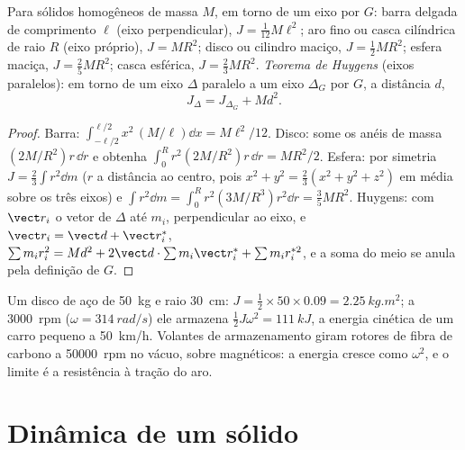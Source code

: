 \begin{proposition}\label{prop:b2:rigid-body-mechanics:inertia}
Para sólidos homogêneos de massa $M$, em torno de um eixo por $G$: barra
delgada de comprimento $\ell$ (eixo perpendicular), $J = \tfrac1{12}M\ell^2$; aro
fino ou casca cilíndrica de raio $R$ (eixo próprio), $J = MR^2$; disco ou
cilindro maciço, $J = \tfrac12MR^2$; esfera maciça, $J = \tfrac25MR^2$; casca
esférica, $J = \tfrac23MR^2$. \emph{Teorema de Huygens} (eixos paralelos): em
torno de um eixo $\Delta$ paralelo a um eixo $\Delta_G$ por $G$, a distância
$d$,
\[
J_\Delta = J_{\Delta_G} + Md^2 .
\]
\end{proposition}

\begin{proof}
Barra: $\int_{-\ell/2}^{\ell/2}x^2\,(M/\ell)\dd x = M\ell^2/12$. Disco: some os anéis
de massa $(2M/R^2)r\,\dd r$ e obtenha $\int_0^R r^2(2M/R^2)r\,\dd r = MR^2/2$. Esfera: por
simetria $J = \tfrac23\int r^2\dd m$ ($r$ a distância ao centro,
pois $x^2 + y^2 = \tfrac23(x^2 + y^2 + z^2)$ em média sobre os três
eixos) e $\int r^2\dd m = \int_0^R r^2(3M/R^3)r^2\dd r = \tfrac35MR^2$.
Huygens: com $\vect r_i$ o vetor de $\Delta$ até $m_i$, perpendicular
ao eixo, e $\vect r_i = \vect d + \vect r_i^*$, $\sum m_ir_i^2 = Md^2
+ 2\vect d\cdot\sum m_i\vect r_i^* + \sum m_ir_i^{*2}$, e a soma do meio
se anula pela definição de $G$.
\end{proof}

\begin{example}\label{ex:b2:rigid-body-mechanics:flywheel}
Um disco de aço de \qty{50}{kg} e raio \qty{30}{cm}: $J = \tfrac12 \times
50 \times 0.09 = \qty{2.25}{kg.m^2}$; a \qty{3000}{rpm} ($\omega =
\qty{314}{rad/s}$) ele armazena $\tfrac12J\omega^2 = \qty{111}{kJ}$, a
energia cinética de um carro pequeno a \qty{50}{km/h}. Volantes de
armazenamento giram rotores de fibra de carbono a \qty{50000}{rpm} no
vácuo, sobre  magnéticos: a energia cresce como $\omega^2$, e o
limite é a resistência à tração do aro.
\end{example}

\section{Dinâmica de um sólido}

